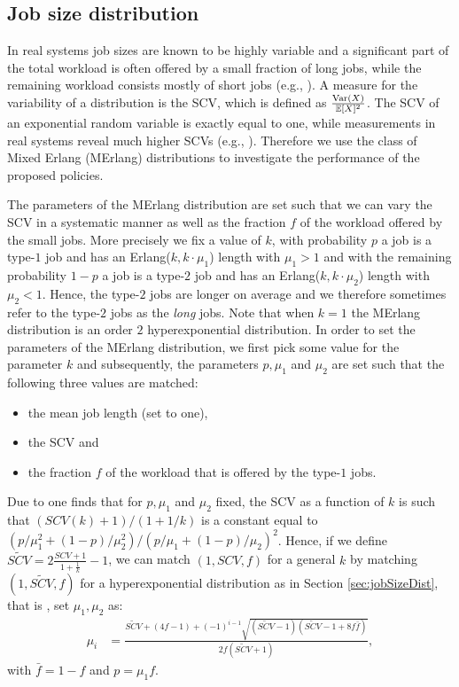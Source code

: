 \documentclass[12pt]{report}
\newcommand{\E}{\mathbb{E}}
\begin{document}
\subsection{Job size distribution}\label{sec:PH}
In real systems job sizes are known to be highly variable and a significant part of the total workload is often offered by a small fraction of long jobs, while the remaining workload consists mostly of short jobs (e.g., \cite{Sparrow,delgado2016job, delgado2015hawk}). A measure for the variability of a distribution is the SCV, which is defined as $\frac{\textup{Var}(X)}{\E[X]^2}$. The SCV of an exponential random variable is exactly equal to one, while measurements in real systems reveal much higher SCVs (e.g., \cite[Chapter 20]{bookMor}). Therefore we use the class of Mixed Erlang (MErlang) distributions to investigate the performance of the proposed policies.

The parameters of the MErlang distribution are set such that we can vary the SCV in a systematic manner as well as the fraction $f$ of the workload offered by the small jobs. 
More precisely we fix a value of $k$, with probability $p$ a job is a type-$1$ job and has an Erlang($k, k\cdot \mu_1$) length with $\mu_1 > 1$ and with the remaining probability $1-p$ a job is a type-$2$ job and
has an Erlang($k, k\cdot \mu_2$) length with $\mu_2 < 1$. Hence, the type-$2$ jobs are longer on average
and we therefore sometimes refer to the type-$2$ jobs as the {\it long} jobs. 
Note that when $k=1$ the MErlang distribution is an order $2$ hyperexponential 
distribution. In order to set the parameters of the MErlang distribution, 
we first pick some value for the parameter $k$ and subsequently, the parameters $p, \mu_1$ and $\mu_2$ are set such that the following three values are matched: 
\begin{itemize}
\item the mean job length (set to one),
\item the SCV and
\item the fraction $f$ of the workload that is offered by the type-$1$ jobs.
\end{itemize}
Due to \cite[Equation (4)]{fang2001hyper} one finds that for 
$p, \mu_1$ and $\mu_2$ fixed, the SCV as a function of $k$ is such that
$(SCV(k)+1)/(1+1/k)$ is a constant equal to $(p/\mu_1^2+(1-p)/\mu_2^2)/(p/\mu_1+(1-p)/\mu_2)^2$.
Hence, if we define $\widetilde{SCV} = 2\frac{SCV+1}{1+\frac{1}{k}}-1$,
we can match $(1,SCV,f)$ for a general $k$ by matching
$(1,\widetilde{SCV},f)$ for a hyperexponential distribution 
as in Section \ref{sec:jobSizeDist},
that is , set $\mu_1, \mu_2$ as:
\begin{align*}
 \mu_{i} &= \frac{\widetilde{SCV}+(4f-1)+(-1)^{i-1} \sqrt{(\widetilde{SCV}-1)(\widetilde{SCV}-1+8f\bar f)}}{2f(\widetilde{SCV}+1)},
\end{align*}
with $\bar f = 1-f$  and $p = \mu_1 f$. 
\end{document}
